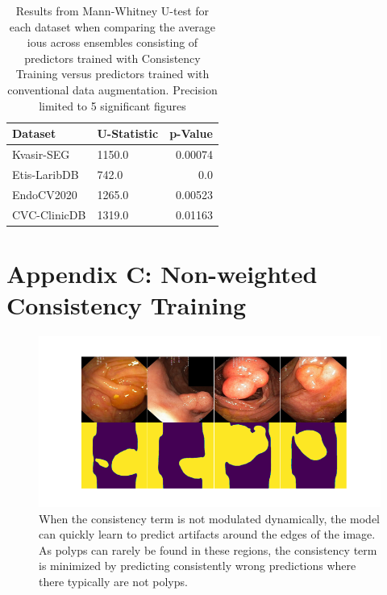 \begin{table}[htb]
    \centering
    \begin{tabularx}{\linewidth}{lXr}
        \toprule
        Dataset & U-Statistic & p-Value \\
        \midrule
        Kvasir-SEG & 1150.0 & 0.00074 \\ 
        Etis-LaribDB & 742.0 & 0.0 \\ 
        EndoCV2020 & 1265.0 & 0.00523 \\ 
        CVC-ClinicDB & 1319.0 & 0.01163 \\ 
        \bottomrule
    \end{tabularx}
    \caption[Mann-Whitney U-test results ensembles]{Results from Mann-Whitney U-test for each dataset when comparing the average \glspl{iou} across ensembles consisting of predictors trained with Consistency Training versus predictors trained with conventional data augmentation. Precision limited to 5 significant figures}
    \label{tab:ttest_avgs_ensemble}
\end{table}
    

\newpage
\chapter*{Appendix C: Non-weighted Consistency Training}\label{non_weighted_ctraining}

\begin{figure}[htb]
    \centering
    \includegraphics[width=\linewidth]{illustrations/artefacts.png}
    \caption[Unweighted Consistency example]{When the consistency term is not modulated dynamically, the model can quickly learn to predict artifacts around the edges of the image. As polyps can rarely be found in these regions, the consistency term is minimized by predicting consistently wrong predictions where there typically are not polyps. }
    \label{fig:non_weighted_ctraining}
\end{figure}

